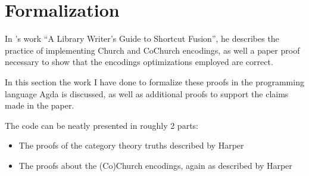 \section{Formalization}\label{sec:formalization}
In \cite{Harper2011}'s work ``A Library Writer's Guide to Shortcut Fusion'', he describes the practice of implementing Church and CoChurch encodings, as well a paper proof necessary to show that the encodings optimizations employed are correct.

In this section the work I have done to formalize these proofs in the programming language Agda is discussed, as well as additional proofs to support the claims made in the paper.

The code can be neatly presented in roughly 2 parts:
\begin{itemize}
  \item The proofs of the category theory truths described by Harper
  \item The proofs about the (Co)Church encodings, again as described by Harper
\end{itemize}




